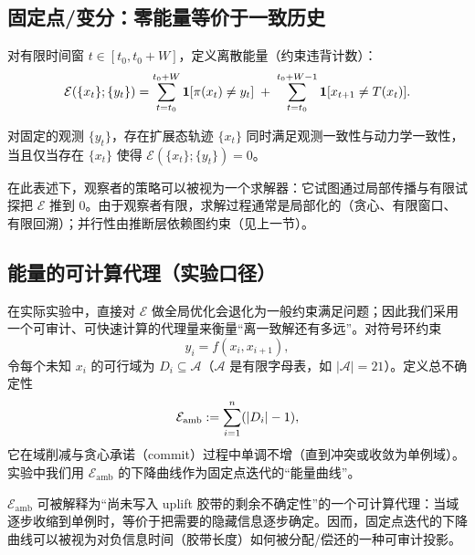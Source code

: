 \subsection{固定点/变分：零能量等价于一致历史}

对有限时间窗 \(t\in[t_0,t_0+W]\)，定义离散能量（约束违背计数）：
\[
\mathcal E(\{x_t\};\{y_t\})
=\sum_{t=t_0}^{t_0+W}\mathbf 1[\pi(x_t)\neq y_t]
\;+\;
\sum_{t=t_0}^{t_0+W-1}\mathbf 1[x_{t+1}\neq T(x_t)].
\]

\begin{proposition}[一致历史的等价刻画]
对固定的观测 \(\{y_t\}\)，存在扩展态轨迹 \(\{x_t\}\) 同时满足观测一致性与动力学一致性，当且仅当存在 \(\{x_t\}\) 使得 \(\mathcal E(\{x_t\};\{y_t\})=0\)。
\end{proposition}

\begin{remark}[固定点与有限观察者]
在此表述下，观察者的策略可以被视为一个求解器：它试图通过局部传播与有限试探把 \(\mathcal E\) 推到 0。由于观察者有限，求解过程通常是局部化的（贪心、有限窗口、有限回溯）；并行性由推断层依赖图约束（见上一节）。
\end{remark}

\subsection{能量的可计算代理（实验口径）}

在实际实验中，直接对 \(\mathcal E\) 做全局优化会退化为一般约束满足问题；因此我们采用一个可审计、可快速计算的代理量来衡量“离一致解还有多远”。对符号环约束
\[
y_i=f(x_i,x_{i+1}),
\]
令每个未知 \(x_i\) 的可行域为 \(D_i\subseteq\mathcal A\)（\(\mathcal A\) 是有限字母表，如 \(|\mathcal A|=21\)）。定义总不确定性
\[
\mathcal E_{\mathrm{amb}}:=\sum_{i=1}^{n}(\left\lvert D_i\right\rvert-1),
\]
它在域削减与贪心承诺（commit）过程中单调不增（直到冲突或收敛为单例域）。实验中我们用 \(\mathcal E_{\mathrm{amb}}\) 的下降曲线作为固定点迭代的“能量曲线”。

\begin{remark}[从能量代理到负信息时间]
\(\mathcal E_{\mathrm{amb}}\) 可被解释为“尚未写入 uplift 胶带的剩余不确定性”的一个可计算代理：当域逐步收缩到单例时，等价于把需要的隐藏信息逐步确定。因而，固定点迭代的下降曲线可以被视为对负信息时间（胶带长度）如何被分配/偿还的一种可审计投影。
\end{remark}


